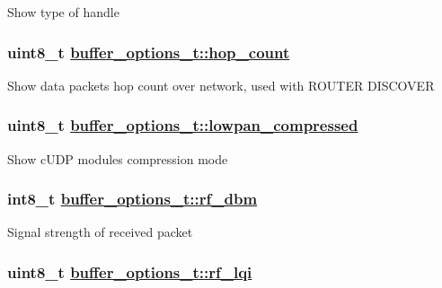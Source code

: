 Show type of handle \hypertarget{structbuffer__options__t_f6af386458431a08a8b738dd3836a3c6}{
\subsubsection[hop\_\-count]{\setlength{\rightskip}{0pt plus 5cm}uint8\_\-t \hyperlink{structbuffer__options__t_f6af386458431a08a8b738dd3836a3c6}{buffer\_\-options\_\-t::hop\_\-count}}}
\label{structbuffer__options__t_f6af386458431a08a8b738dd3836a3c6}


Show data packets hop count over network, used with ROUTER DISCOVER \hypertarget{structbuffer__options__t_4ee6fc95c4cf1f37cf59c66a3f7984e5}{
\subsubsection[lowpan\_\-compressed]{\setlength{\rightskip}{0pt plus 5cm}uint8\_\-t \hyperlink{structbuffer__options__t_4ee6fc95c4cf1f37cf59c66a3f7984e5}{buffer\_\-options\_\-t::lowpan\_\-compressed}}}
\label{structbuffer__options__t_4ee6fc95c4cf1f37cf59c66a3f7984e5}


Show c\-UDP modules compression mode \hypertarget{structbuffer__options__t_7ab085df01d06758397a0a20ae7e456e}{
\subsubsection[rf\_\-dbm]{\setlength{\rightskip}{0pt plus 5cm}int8\_\-t \hyperlink{structbuffer__options__t_7ab085df01d06758397a0a20ae7e456e}{buffer\_\-options\_\-t::rf\_\-dbm}}}
\label{structbuffer__options__t_7ab085df01d06758397a0a20ae7e456e}


Signal strength of received packet \hypertarget{structbuffer__options__t_2aec4493d07fae7bb2801231085d1bcb}{
\subsubsection[rf\_\-lqi]{\setlength{\rightskip}{0pt plus 5cm}uint8\_\-t \hyperlink{structbuffer__options__t_2aec4493d07fae7bb2801231085d1bcb}{buffer\_\-options\_\-t::rf\_\-lqi}}}
\label{structbuffer__options__t_2aec4493d07fae7bb2801231085d1bcb}


